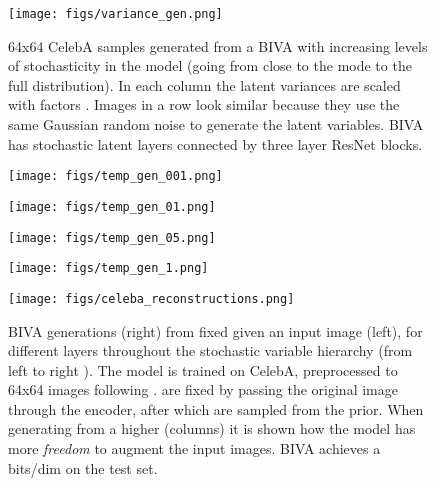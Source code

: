 \documentclass{article}
\def\nm{BIVA\xspace}
\begin{document}
\begin{figure}[!h]
  \begin{center}
    \texttt{[image: figs/variance\_gen.png]}
  \end{center}
\caption{64x64 CelebA samples generated from a \nm with increasing levels of stochasticity in the model (going from close to the mode to the full distribution). In each column the latent variances are scaled with factors .
Images in a row look similar because they use the same Gaussian 
random noise  to generate the latent variables. \nm has  stochastic latent layers connected by three layer ResNet blocks.}
\label{fig:celeba_var_gen}
\end{figure}

\begin{figure*}[!h]
\centering
\begin{subfigure}{0.49\textwidth}
\centering
\texttt{[image: figs/temp\_gen\_001.png]}
\caption{}
\label{fig:temp001}
\end{subfigure}
\begin{subfigure}{0.49\textwidth}
\centering
\texttt{[image: figs/temp\_gen\_01.png]}
\caption{}
\label{fig:temp01}
\end{subfigure}

\begin{subfigure}{0.49\textwidth}
\centering
\texttt{[image: figs/temp\_gen\_05.png]}
\caption{}
\label{fig:temp01b}
\end{subfigure}
\begin{subfigure}{0.49\textwidth}
\centering
\texttt{[image: figs/temp\_gen\_1.png]}
\caption{}
\label{fig:temp001b}
\end{subfigure}
\caption{\nm  generations with varying  for (a), (b), (c) and (d) respectively. We follow the same generating procedure of Figure \ref{fig:celeba_var_gen}. \nm has  stochastic latent variables and is trained on the CelebA dataset, preprocessed to 64x64 images following \citep{Larsen16}. \nm achieves a  bits/dim on the test set. Close to the mode of the latent distribution there is very little variance in generated natural images. When we \textit{loosen} the samples towards the full distribution, , we can see how the generated images are adopting different styles and contexts.}
\end{figure*}

\begin{figure}[!h]
\centering
\texttt{[image: figs/celeba\_reconstructions.png]}
\caption{\nm  generations (right) from fixed  given an input image (left), for different layers throughout the stochastic variable hierarchy (from left to right ). The model is trained on CelebA, preprocessed to 64x64 images following \citep{Larsen16}.  are fixed by passing the original image through the encoder, after which  are sampled from the prior. When generating from a higher  (columns) it is shown how the model has more \textit{freedom} to augment the input images. \nm achieves a  bits/dim on the test set.}
\end{figure}
\end{document}
